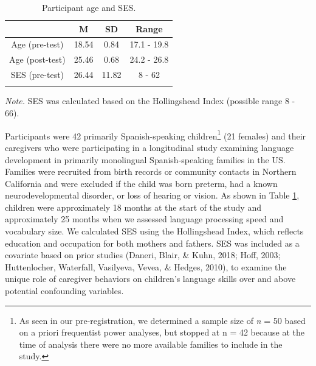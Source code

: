 \documentclass[
  english,
  man,mask]{apa6}
\begin{document}
\begin{table}[tbp]

\begin{center}
\begin{threeparttable}

\caption{\label{tab:tab0}Participant age and SES.}

\begin{tabular}{cccc}
\toprule
  & \multicolumn{1}{c}{M} & \multicolumn{1}{c}{SD} & \multicolumn{1}{c}{Range}\\
\midrule
Age (pre-test) & 18.54 & 0.84 & 17.1 - 19.8\\
Age (post-test) & 25.46 & 0.68 & 24.2 - 26.8\\
SES (pre-test) & 26.44 & 11.82 & 8 - 62\\
\bottomrule
\addlinespace
\end{tabular}

\begin{tablenotes}[para]
\normalsize{\textit{Note.} SES was calculated based on the Hollingshead Index (possible range 8 - 66).}
\end{tablenotes}

\end{threeparttable}
\end{center}

\end{table}

Participants were 42 primarily Spanish-speaking children\footnote{As seen in our pre-registration, we determined a sample size of \emph{n} = 50 based on a priori frequentist power analyses, but stopped at n = 42 because at the time of analysis there were no more available families to include in the study.} (21 females) and their caregivers who were participating in a longitudinal study examining language development in primarily monolingual Spanish-speaking families in the US. Families were recruited from birth records or community contacts in Northern California and were excluded if the child was born preterm, had a known neurodevelopmental disorder, or loss of hearing or vision. As shown in Table \ref{tab:tab0}, children were approximately 18 months at the start of the study and approximately 25 months when we assessed language processing speed and vocabulary size. We calculated SES using the Hollingshead Index, which reflects education and occupation for both mothers and fathers. SES was included as a covariate based on prior studies (Daneri, Blair, \& Kuhn, 2018; Hoff, 2003; Huttenlocher, Waterfall, Vasilyeva, Vevea, \& Hedges, 2010), to examine the unique role of caregiver behaviors on children's language skills over and above potential confounding variables.
\end{document}
